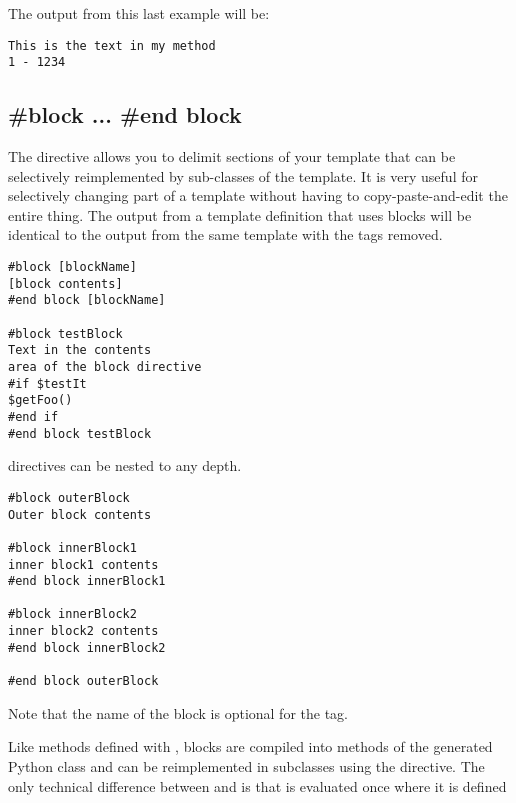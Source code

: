 The output from this last example will be:

\begin{verbatim}
This is the text in my method 
1 - 1234
\end{verbatim}

\subsection{\#block ... \#end block}
\label{inheritanceEtc.block}

The  directive allows you to delimit sections of your template
that can be selectively reimplemented by sub-classes of the template.  It is
very useful for selectively changing part of a template without having to
copy-paste-and-edit the entire thing.  The output from a template definition
that uses blocks will be identical to the output from the same template with the 
 tags removed. 

\begin{verbatim}
#block [blockName] 
[block contents] 
#end block [blockName]

#block testBlock
Text in the contents 
area of the block directive
#if $testIt
$getFoo() 
#end if
#end block testBlock
\end{verbatim}

 directives can be nested to any depth.

\begin{verbatim}
#block outerBlock
Outer block contents 

#block innerBlock1
inner block1 contents 
#end block innerBlock1

#block innerBlock2
inner block2 contents 
#end block innerBlock2

#end block outerBlock
\end{verbatim}

Note that the name of the block is optional for the  tag.

Like methods defined with , blocks are compiled into methods of the
generated Python class and can be reimplemented in subclasses using the
 directive.  The only technical difference between
 and  is that 
 is evaluated once where it is defined

